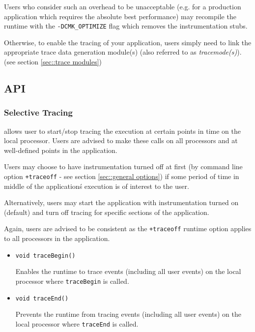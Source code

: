 \documentclass[10pt]{article}
\begin{document}
Users who consider such an overhead to be unacceptable (e.g. for a
production application which requires the absolute best performance)
may recompile the \charmpp{} runtime with the {\tt -DCMK\_OPTIMIZE}
flag which removes the instrumentation stubs.

Otherwise, to enable the tracing of your application, users simply
need to link the appropriate trace data generation module(s) (also
referred to as {\em tracemode(s)}). (see section \ref{sec::trace modules})

\subsection{\projections{} API}
\label{sec::api}

\subsubsection{Selective Tracing}
\label{sec::selective tracing}

\charmpp{} allows user to start/stop tracing the execution at certain
points in time on the local processor. Users are advised to make these
calls on all processors and at well-defined points in the application.

Users may choose to have instrumentation turned off at first (by
command line option {\tt +traceoff} - see section \ref{sec::general options}) if some period of time in middle of the
application\'s execution is of interest to the user.

Alternatively, users may start the application with instrumentation
turned on (default) and turn off tracing for specific sections of the
application.

Again, users are advised to be consistent as the {\tt +traceoff}
runtime option applies to all processors in the application.

\begin{itemize}
\item
{\tt void traceBegin()}

Enables the runtime to trace events (including all user events) on the local processor where {\tt traceBegin} is called.

\item
{\tt void traceEnd()}

Prevents the runtime from tracing events (including all user events) on the local processor where {\tt traceEnd} is called.

\end{itemize}
\end{document}
